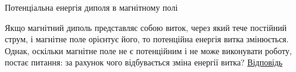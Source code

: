 \documentclass{beamer}
\begin{document}
\begin{frame}{Потенціальна енергія диполя в магнітному полі}{}
	\begin{alertblock}{}\scriptsize\justifying
		Якщо магнітний диполь представляє собою виток, через який тече постійний струм, і магнітне поле орієнтує його, то потенційна енергія витка
		змінюється. Однак, оскільки магнітне поле не є потенційним і не може виконувати роботу, постає питання: за рахунок чого відбувається зміна
		енергії
		витка?
		\href{https://chatgpt.com/share/671944e1-0220-8013-9fb3-11bfec044641}{\color{blue}Відповідь}
	\end{alertblock}

\end{frame}





\end{document}
